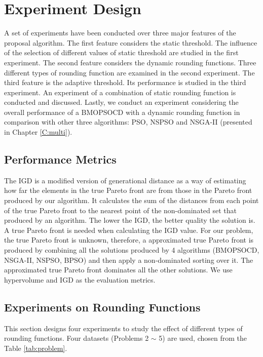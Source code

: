 \section{Experiment Design}
\label{sec:exp}
A set of experiments have been conducted over three major features of the proposal algorithm. 
The first feature considers the static threshold. The influence of the selection of 
different values of static threshold are studied in the first experiment. 
The second feature considers the dynamic rounding functions. Three different types of 
rounding function are examined in the second experiment. The third feature is the adaptive threshold. Its performance is studied in the third experiment. An experiment of a combination of static rounding function is conducted and discussed. Lastly, we conduct an experiment 
considering the overall performance of a BMOPSOCD with a dynamic rounding function in comparison with other three algorithms: PSO, NSPSO and NSGA-II (presented in Chapter \ref{C:multi}).



\subsection{Performance Metrics}
The IGD \cite{1501598} is a modified version of generational distance \cite{veldhuizen99, 870296} as a way of estimating 
how far the elements in the true Pareto front are from those in the Pareto front produced by our algorithm. 
It calculates the sum of the distances from each point of the true Pareto front to the nearest point of the non-dominated set that produced by an algorithm.
The lower the IGD, the better quality the solution is.
A true Pareto front is needed when calculating the IGD value.
For our problem, the true Pareto front is unknown, therefore, a approximated true Pareto front is produced by combining all the solutions produced by
4 algorithms (BMOPSOCD, NSGA-II, NSPSO, BPSO) and then apply a non-dominated sorting over it. The approximated true Pareto front dominates all the other solutions.
We use hypervolume and IGD as the evaluation metrics.

\subsection{Experiments on Rounding Functions}
This section designs four experiments to study the effect of different types of rounding functions. Four datasets (Problems 2 $\sim$ 5) are used, chosen from the Table \ref{tab:problem}. 

